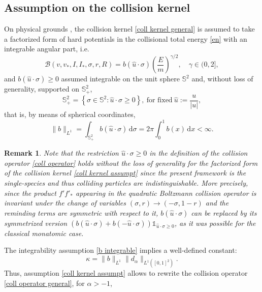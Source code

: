 \documentclass[11pt,a4paper]{amsart}
\newcommand{\bS}{\mathbb{S}^2}
\newcommand{\bSp}{\mathbb{S}^2_+}
\newcommand{\md}{\mathrm{d}}
\newcommand{\g}{\gamma}
\newcommand{\E}{\left(\frac{E}{m}\right)}
\newcommand{\param}{ \sigma, r, R}
\newtheorem{remark}{Remark}
\begin{document}
 \subsection{Assumption on the collision kernel} On physical grounds \cite{MPC-Dj-T, MPC-Dj-T-O},
 the collision kernel \eqref{coll kernel general}  is assumed to take a factorized form of hard potentials in the collisional total energy \eqref{en}  with an  integrable angular part, i.e.
 \begin{equation}\label{coll kernel assumpt}
 	\mathcal{B}(v,v_*,I,I_*,\param)  =  b(\hat{u}\cdot\sigma) \E^{\g/2}, \quad \g  \in (0,2], 
 \end{equation}
 and  $b(\hat{u}\cdot\sigma) \geq 0$ 
 assumed integrable  on the unit sphere  $\bS$ and, without   loss of generality, supported on $\bSp$,
 \begin{equation*}
 	\bSp = \left\{ \sigma \in \bS: \hat{u} \cdot \sigma \geq 0 \right\},  \  \text{for   fixed} \ \hat{u}:= \frac{u}{|u|},
 \end{equation*}
 that is,  by means of spherical coordinates, 
 \begin{equation}\label{b integrable}
 	\| b \|_{L^1} = \int_{\bSp} b(\hat{u}\cdot\sigma) \, \md \sigma  = 2 \pi \int_{0}^1 b(x) \, \md x < \infty.
 \end{equation}
 \begin{remark} Note that the restriction $\hat{u} \cdot  \sigma \geq 0$ in the definition of the collision operator \eqref{coll operator} holds without the loss of generality for the factorized form of the collision kernel \eqref{coll kernel assumpt} since the present framework is the single-species and thus colliding particles are indistinguishable. More precisely, since the product $f' f'_*$ appearing in the quadratic Boltzmann collision operator is invariant under the change of variables $(\sigma, r) \rightarrow (- \sigma, 1-r)$ and the reminding  terms are symmetric with respect to it,  $b(\hat{u} \cdot  \sigma)$ can be replaced by its symmetrized version $(b(\hat{u} \cdot  \sigma) + b( - \hat{u} \cdot  \sigma)) \mathds{1}_{\hat{u} \cdot  \sigma \geq 0}$, as it was possible for the classical monatomic case. 
 \end{remark}
 The integrability assumption \eqref{b integrable} implies a well-defined constant:
 \begin{equation}\label{kappa}
 	\kappa = 	\| b \|_{L^1}  \| d_\alpha \|_{L^1([0,1]^2)}. 
 \end{equation}
 Thus, assumption \eqref{coll kernel assumpt} allows to rewrite the collision operator \eqref{coll operator general}, 	for $ \alpha>-1$,
\end{document}
